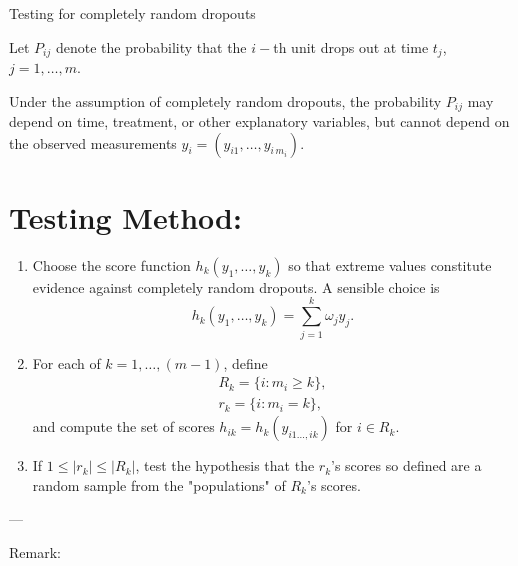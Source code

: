 \documentclass[UTF8,a4paper,10pt]{article}
\begin{document}



\begin{Problem}[]{Testing for completely random dropouts}

    Let \(P_{ij}\) denote the probability that the \(i-\)th unit drops out at time \(t_j\), \(j = 1,\ldots,m\).

    Under the assumption of completely random dropouts, the probability \(P_{ij}\) may depend on time, treatment, or other explanatory variables, but cannot depend on the observed measurements \(y_{i} = (y_{i1}, \ldots, y_{i\,m_i})\).

    \section*{Testing Method:}
    \begin{enumerate}[label=(\alph*)]
        \item Choose the score function \(h_{k}(y_{1},\ldots,y_{k})\) so that extreme values constitute evidence against completely random dropouts. A sensible choice is 
        \[h_{k}(y_{1},\ldots,y_{k}) = \sum_{j=1}^{k}\omega_{j}y_{j}.\]
        \item For each of \(k = 1, \ldots, (m-1)\), define
        \begin{align*}
            R_{k} = \{i:m_i\geq k\},\\
            r_{k} = \{i:m_i = k\},
        \end{align*}
        and compute the set of scores \(h_{ik} = h_k(y_{i1\ldots,ik})\) for \(i\in R_{k}\).
        \item If \(1\leq |r_k|\leq |R_k|\), test the hypothesis that the \(r_k\)'s scores so defined are a random sample from the "populations" of \(R_k\)'s scores.
    \end{enumerate}
---

Remark:


\end{Problem}
\end{document}
